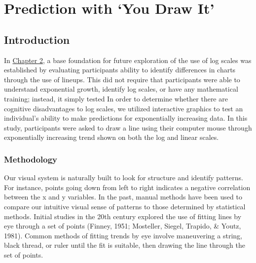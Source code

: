 \documentclass[print]{nuthesis}
\begin{document}
\hypertarget{youdrawit}{%
\chapter{Prediction with `You Draw It'}\label{youdrawit}}

\hypertarget{introduction-1}{%
\section{Introduction}\label{introduction-1}}

In \protect\hyperlink{lineups}{Chapter 2}, a base foundation for future exploration of the use of log scales was established by evaluating participants ability to identify differences in charts through the use of lineups.
This did not require that participants were able to understand exponential growth, identify log scales, or have any mathematical training; instead, it simply tested  
In order to determine whether there are cognitive disadvantages to log scales, we utilized interactive graphics to test an individual's ability to make predictions for exponentially increasing data.
In this study, participants were asked to draw a line using their computer mouse through  exponentially increasing trend shown on both the log and linear scales.

\hypertarget{methodology}{%
\subsection{\texorpdfstring{ Methodology}{ Methodology}}\label{methodology}}

Our visual system is naturally built to look for structure and identify patterns.
For instance, points going down from left to right indicates a negative correlation between the x and y variables.
In the past, manual methods have been used to compare our intuitive visual sense of patterns to those determined by statistical methods.
Initial studies in the 20th century explored the use of fitting lines by eye through a set of points (Finney, 1951; Mosteller, Siegel, Trapido, \& Youtz, 1981).
Common methods of fitting trends by eye involve maneuvering a string, black thread, or ruler until the fit is suitable, then drawing the line through the set of points.
\end{document}
